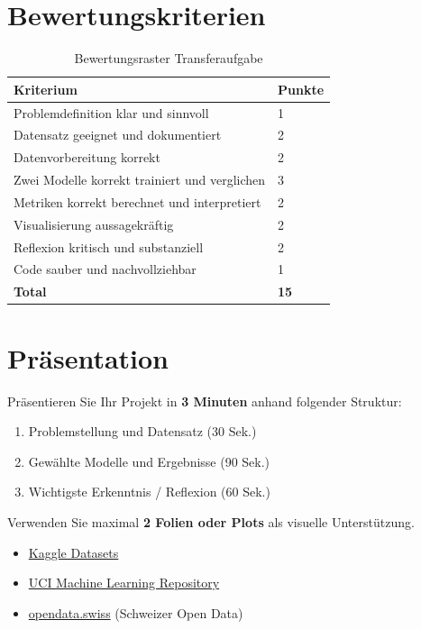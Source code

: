 \section{Bewertungskriterien}

\begin{table}[H]
\centering
\small
\begin{tabular}{p{5.5cm}p{1.5cm}}
\toprule
\textbf{Kriterium} & \textbf{Punkte} \\
\midrule
Problemdefinition klar und sinnvoll & 1 \\
Datensatz geeignet und dokumentiert & 2 \\
Datenvorbereitung korrekt & 2 \\
Zwei Modelle korrekt trainiert und verglichen & 3 \\
Metriken korrekt berechnet und interpretiert & 2 \\
Visualisierung aussagekräftig & 2 \\
Reflexion kritisch und substanziell & 2 \\
Code sauber und nachvollziehbar & 1 \\
\midrule
\textbf{Total} & \textbf{15} \\
\bottomrule
\end{tabular}
\caption{Bewertungsraster Transferaufgabe}
\label{tab:bewertung-transfer-15}
\end{table}

\section{Präsentation}

\begin{myexercise}
Präsentieren Sie Ihr Projekt in \textbf{3 Minuten} anhand folgender Struktur:
\begin{enumerate}
    \item Problemstellung und Datensatz (30 Sek.)
    \item Gewählte Modelle und Ergebnisse (90 Sek.)
    \item Wichtigste Erkenntnis / Reflexion (60 Sek.)
\end{enumerate}
Verwenden Sie maximal \textbf{2 Folien oder Plots} als visuelle Unterstützung.
\end{myexercise}

\begin{myremark}
\begin{itemize}
    \item \href{https://www.kaggle.com/datasets}{Kaggle Datasets}
    \item \href{https://archive.ics.uci.edu/}{UCI Machine Learning Repository}
    \item \href{https://opendata.swiss/de}{opendata.swiss} (Schweizer Open Data)
\end{itemize}
\end{myremark}
